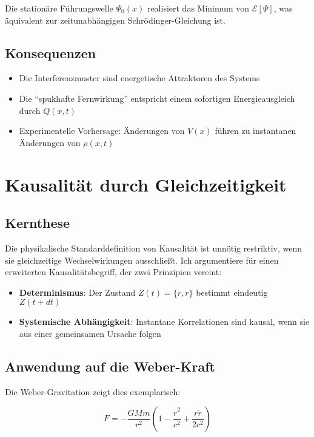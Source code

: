Die stationäre Führungswelle $\Psi_0(x)$ realisiert das Minimum von $\mathcal{E}[\Psi]$, was äquivalent zur zeitunabhängigen Schrödinger-Gleichung ist.

\subsection{Konsequenzen}

\begin{itemize}
\item Die Interferenzmuster sind energetische Attraktoren des Systems
\item Die \enquote{spukhafte Fernwirkung} entspricht einem sofortigen Energieausgleich durch $Q(x,t)$
\item Experimentelle Vorhersage: Änderungen von $V(x)$ führen zu instantanen Änderungen von $\rho(x,t)$
\end{itemize}

\section{Kausalität durch Gleichzeitigkeit}
\label{sec:gleichzeitige_kausalitaet}

\subsection{Kernthese}
Die physikalische Standarddefinition von Kausalität ist unnötig restriktiv, wenn sie gleichzeitige Wechselwirkungen ausschließt. Ich argumentiere für einen erweiterten Kausalitätsbegriff, der zwei Prinzipien vereint:

\begin{itemize}
    \item \textbf{Determinismus}: Der Zustand $Z(t) = \{r, \dot{r}\}$ bestimmt eindeutig $Z(t+dt)$
    \item \textbf{Systemische Abhängigkeit}: Instantane Korrelationen sind kausal, wenn sie aus einer gemeinsamen Ursache folgen
\end{itemize}

\subsection{Anwendung auf die Weber-Kraft}
Die Weber-Gravitation zeigt dies exemplarisch:

\begin{equation}
    F = -\frac{GMm}{r^2}\left(1 - \frac{\dot{r}^2}{c^2} + \frac{r\ddot{r}}{2c^2}\right)
\end{equation}


